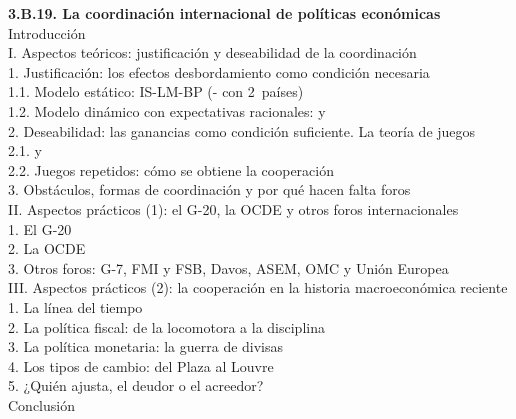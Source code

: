 \documentclass[11pt]{article}
\begin{document}
\begin{esquema}[unbreakable]
\textbf{3.B.19. La coordinación internacional de políticas económicas}\\[2pt]
Introducción\\
I. Aspectos teóricos: justificación y deseabilidad de la coordinación\\
\hspace*{1.5em}1. Justificación: los efectos desbordamiento como condición necesaria\\
\hspace*{3em}1.1. Modelo estático: IS-LM-BP (- con 2~países)\\
\hspace*{3em}1.2. Modelo dinámico con expectativas racionales:  y \\
\hspace*{1.5em}2. Deseabilidad: las ganancias como condición suficiente. La teoría de juegos\\
\hspace*{3em}2.1.  y \\
\hspace*{3em}2.2. Juegos repetidos: cómo se obtiene la cooperación\\
\hspace*{1.5em}3. Obstáculos, formas de coordinación y por qué hacen falta foros\\
II. Aspectos prácticos (1): el G-20, la OCDE y otros foros internacionales\\
\hspace*{1.5em}1. El G-20\\
\hspace*{1.5em}2. La OCDE\\
\hspace*{1.5em}3. Otros foros: G-7, FMI y FSB, Davos, ASEM, OMC y Unión Europea\\
III. Aspectos prácticos (2): la cooperación en la historia macroeconómica reciente\\
\hspace*{1.5em}1. La línea del tiempo\\
\hspace*{1.5em}2. La política fiscal: de la locomotora a la disciplina\\
\hspace*{1.5em}3. La política monetaria: la guerra de divisas\\
\hspace*{1.5em}4. Los tipos de cambio: del Plaza al Louvre\\
\hspace*{1.5em}5. ¿Quién ajusta, el deudor o el acreedor?\\
Conclusión
\end{esquema}
\end{document}
